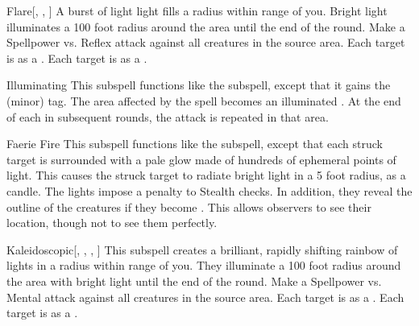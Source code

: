 \begin{ability}[\nth{1}]{Flare}[, , ]
A burst of light light fills a \areasmall radius within \rngmed range of you.
Bright light illuminates a 100 foot radius around the area until the end of the round.
Make a Spellpower vs. Reflex attack against all creatures in the source area.
\hit Each target is \dazzled as a .
\crit Each target is \blinded as a .
\end{ability}
\vspace{0.25em}


\begin{ability}[\nth{2}]{Illuminating}
This subspell functions like the  subspell, except that it gains the  (minor) tag.
The area affected by the spell becomes an illuminated .
At the end of each  in subsequent rounds, the attack is repeated in that area.
\end{ability}
\vspace{0.25em}


\begin{ability}[\nth{3}]{Faerie Fire}
This subspell functions like the  subspell, except that each struck target is surrounded with a pale glow made of hundreds of ephemeral points of light.
This causes the struck target to radiate bright light in a 5 foot radius, as a candle.
The lights impose a  penalty to Stealth checks.
In addition, they reveal the outline of the creatures if they become .
This allows observers to see their location, though not to see them perfectly.
\end{ability}
\vspace{0.25em}


\begin{ability}[\nth{3}]{Kaleidoscopic}[, , , ]
This subspell creates a brilliant, rapidly shifting rainbow of lights in a \areasmall radius within \rngmed range of you.
They illuminate a 100 foot radius around the area with bright light until the end of the round.
Make a Spellpower vs. Mental attack against all creatures in the source area.
\hit Each target is \disoriented as a .
\crit Each target is \confused as a .
\end{ability}
\vspace{0.25em}


